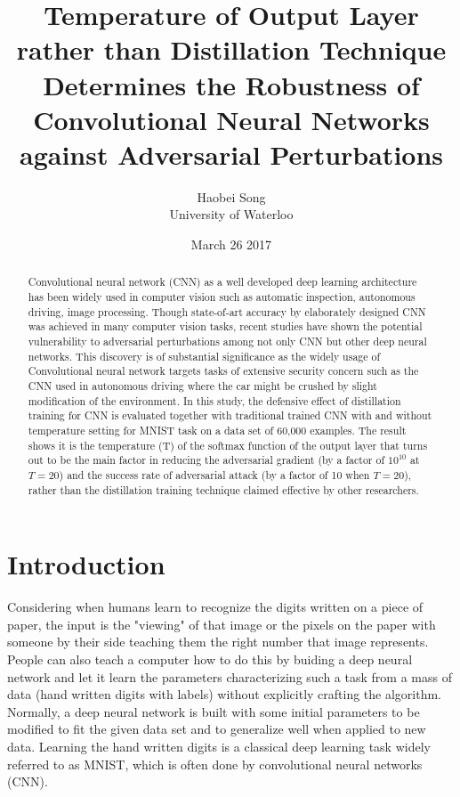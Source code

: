 \documentclass{article}
\title{\textbf{Temperature of Output Layer rather than Distillation Technique Determines the Robustness of Convolutional Neural Networks against Adversarial Perturbations}}
\author{Haobei Song \\
        University of Waterloo}
\date{March 26 2017}
\begin{document}
\maketitle
{}
\newpage
{}

\begin{abstract}
	Convolutional neural network (CNN) as a well developed deep learning architecture has been widely used in computer vision such as automatic inspection, autonomous driving, image processing.
	Though state-of-art accuracy by elaborately designed CNN was achieved in many computer vision tasks, 
	recent studies have shown the potential vulnerability to adversarial perturbations among not only CNN but other deep neural networks.
	This discovery is of substantial significance as the widely usage of Convolutional neural network targets tasks of extensive security concern
	such as the CNN used in autonomous driving where the car might be crushed by slight modification of the environment. 
	In this study, the defensive effect of distillation training for CNN is evaluated together with traditional trained CNN with and without temperature setting for MNIST task on a data set of 60,000 examples.
	The result shows it is the temperature (T) of the softmax function of the output layer that turns out to be the main factor in reducing the adversarial gradient (by a factor of $10^{10}$ at $T=20$) and the success rate of adversarial attack (by a factor of 10 when $T=20$),
 rather than the distillation training technique claimed effective by other researchers.
\end{abstract}
\section{Introduction}
Considering when humans learn to recognize the digits written on a piece of paper, the input is the "viewing" of that image or the pixels on the paper with someone by their side teaching them the right number that image represents.
People can also teach a computer how to do this by buiding a deep neural network and let it learn the parameters characterizing such a task from a mass of data (hand written digits with labels) without explicitly crafting the algorithm.
Normally, a deep neural network is built with some initial parameters to be modified to fit the given data set and to generalize well when applied to new data. Learning the hand written digits is a classical deep learning task widely referred to as MNIST, which is often done by convolutional neural networks (CNN).
\end{document}
